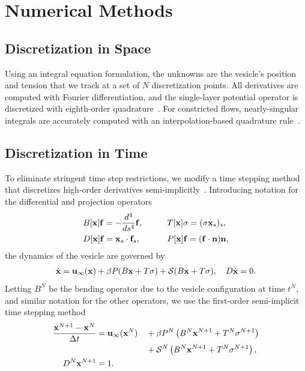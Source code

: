 \documentclass[9pt,twocolumn,twoside,lineno]{pnas-new}
\begin{document}
\section*{Numerical Methods}

\subsection*{Discretization in Space}
Using an integral equation formulation, the unknowns are the vesicle's
position and tension that we track at a set of $N$ discretization
points. All derivatives are computed with Fourier differentiation, and
the single-layer potential operator is discretized with eighth-order
quadrature~\cite{alp1999}. For constricted flows, nearly-singular
integrals are accurately computed with an interpolation-based quadrature
rule~\cite{qua-bir2014}.

\subsection*{Discretization in Time}
To eliminate stringent time step restrictions, we modify a time stepping
method that discretizes high-order derivatives
semi-implicitly~\cite{vee-gue-zor-bir2009}. Introducing notation for the
differential and projection operators
\begin{alignat}{3}
  &B[\mathbf{x}]\mathbf{f} = -\frac{d^4}{ds^4} \mathbf{f},  \qquad
  &&T[\mathbf{x}]\sigma = (\sigma \mathbf{x}_s)_s, \\
  &D[\mathbf{x}]\mathbf{f} = \mathbf{x}_s \cdot \mathbf{f}_s, 
  &&P[\mathbf{x}]\mathbf{f} = (\mathbf{f} \cdot \mathbf{n}) \mathbf{n},
\end{alignat}
the dynamics of the vesicle are governed by
\begin{align}
  \dot{\mathbf{x}} = \mathbf{u}_{\infty}(\mathbf{x}) + 
  \beta P(B\mathbf{x} + T\sigma) + \mathcal{S}(B\mathbf{x} + T\sigma), \quad
  D \dot{\mathbf{x}} = 0.
\end{align}
Letting $B^N$ be the bending operator due to the vesicle configuration
at time $t^N$, and similar notation for the other operators, we use the
first-order semi-implicit time stepping method
\begin{alignat}{3}  
  \frac{\mathbf{x}^{N+1} - \mathbf{x}^N}{\Delta t} &= \mathbf{u}_\infty(\mathbf{x}^N) 
  &&+ \beta P^N\left(B^N\mathbf{x}^{N+1} + T^N\sigma^{N+1}\right) \nonumber \\
  & &&+ \mathcal{S}^N\left(B^N\mathbf{x}^{N+1} + T^N\sigma^{N+1}\right), \\
  D^N\mathbf{x}^{N+1} &= 1.
\end{alignat}
\end{document}
